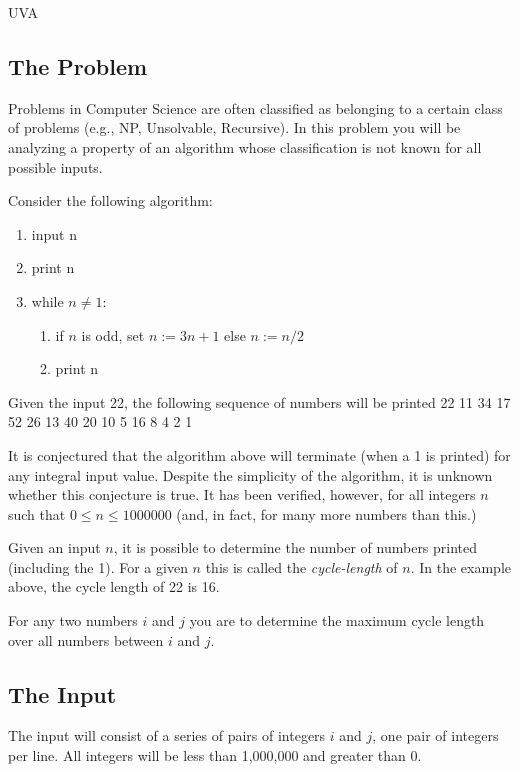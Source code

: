 

\noindent
UVA \bigskip

\subsection*{The Problem}

Problems in Computer Science are often classified as belonging to a
certain class of problems (e.g., NP, Unsolvable, Recursive).  In this
problem you will be analyzing a property of an algorithm whose
classification is not known for all possible inputs.

Consider the following algorithm:
\begin{enumerate}
    \item input n
    \item print n
    \item while $n\neq 1$:
    \begin{enumerate}
        \item if $n$ is odd, set $n:=3n+1$ else $n:=n/2$
        \item print n
    \end{enumerate}
\end{enumerate}

Given the input 22, the following sequence of numbers will be printed
22 11 34 17 52 26 13 40 20 10 5 16 8 4 2 1

It is conjectured that the algorithm above will terminate (when a 1 is
printed) for any integral
input value.  Despite the simplicity of the algorithm,
it is unknown whether this conjecture is true.  It has been verified,
however, for all integers $n$ such that $0\leq n\leq 1000000$  (and, in fact,
for many more numbers than this.)

Given an input $n$, it is possible to determine
the number of numbers printed (including
 the 1).  For a given $n$ this is
called the \emph{cycle-length} of $n$.  In the example above, the cycle
length of 22 is 16.

For any two numbers $i$ and $j$ you are to determine the maximum cycle
length over all numbers between $i$ and
$j$.



\subsection*{The Input}

The input will consist of a series of pairs of integers $i$ and $j$, one pair of
integers per line.  All integers will be less than 1,000,000 and greater
than 0.


